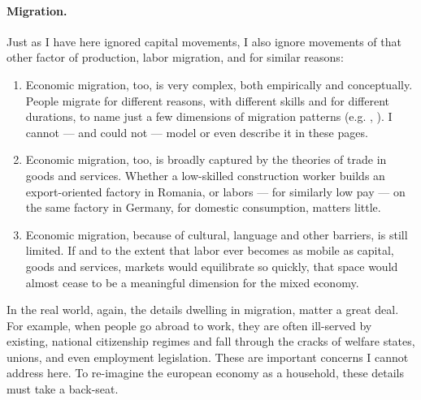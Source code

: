 \documentclass[11pt,a4paper,oneside]{article}
\begin{document}
\paragraph{Migration.}
Just as I have here ignored capital movements, I also ignore movements of that other factor of production, labor migration, and for similar reasons:
\begin{enumerate}
	\item Economic migration, too, is very complex, both empirically and conceptually.
	People migrate for different reasons, with different skills and for different durations, to name just a few dimensions of migration patterns (e.g. \citealt{DeSimone2008}, \citealt{Bems2008}).
	I cannot --- and could not --- model or even describe it in these pages.
	\item Economic migration, too, is broadly captured by the theories of trade in goods and services.
	Whether a low-skilled construction worker builds an export-oriented factory in Romania, or labors --- for similarly low pay --- on the same factory in Germany, for domestic consumption, matters little.
	\item Economic migration, because of cultural, language and other barriers, is still limited.
	If and to the extent that labor ever becomes as mobile as capital, goods and services, markets would equilibrate so quickly, that space would almost cease to be a meaningful dimension for the mixed economy.
\end{enumerate}

In the real world, again, the details dwelling in migration, matter a great deal.
For example, when people go abroad to work, they are often ill-served by existing, national citizenship regimes and fall through the cracks of welfare states, unions, and even employment legislation.
These are important concerns I cannot address here.
To re-imagine the european economy as a household, these details must take a back-seat.
\end{document}
